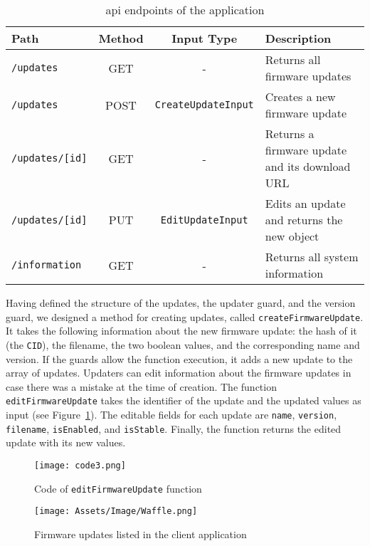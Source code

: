 \documentclass[conference]{IEEEtran}
\begin{document}
\begin{table*}[t]
\centering
\caption{\acs{api} endpoints of the application}
\label{tab:API}
\begin{tabular}{@{}lSSm{6cm}@{}}
{\textbf{Path}}&{\textbf{Method}}&{\textbf{Input Type}}&{\textbf{Description}} \\ \toprule
{\texttt{/updates}}&{GET}&{-}&{Returns all firmware updates} \\ \midrule
{\texttt{/updates}}&{POST}&{\texttt{CreateUpdateInput}}&{Creates a new firmware update} \\ \midrule
{\texttt{/updates/[id]}}&{GET}&{-}&{Returns a firmware update and its download URL} \\ \midrule
{\texttt{/updates/[id]}}&{PUT}&{\texttt{EditUpdateInput}}&{Edits an update and returns the new object} \\ \midrule
{\texttt{/information}}&{GET}&{-}&{Returns all system information} \\ \bottomrule
\end{tabular}
\end{table*}

Having defined the structure of the updates, the updater guard, and the version guard, we designed a method for creating updates, called \texttt{createFirmwareUpdate}. It takes the following information about the new firmware update: the hash of it (the \texttt{CID}), the filename, the two boolean values, and the corresponding name and version. If the guards allow the function execution, it adds a new update to the array of updates. Updaters can edit information about the firmware updates in case there was a mistake at the time of creation. The function \texttt{editFirmwareUpdate} takes the identifier of the update and the updated values as input (see Figure~\ref{fig:code3}). The editable fields for each update are \texttt{name}, \texttt{version}, \texttt{filename}, \texttt{isEnabled}, and \texttt{isStable}. Finally, the function returns the edited update with its new values.

\begin{figure}[h]
\centering
\texttt{[image: code3.png]}
\caption{Code of \texttt{editFirmwareUpdate} function}
\label{fig:code3}
\vspace{-3mm}
\end{figure}

\begin{figure*}[t]
\centering
\texttt{[image: Assets/Image/Waffle.png]}
\caption{Firmware updates listed in the client application}
\label{fig:Waffle}
\vspace{-3mm}
\end{figure*}
\end{document}
